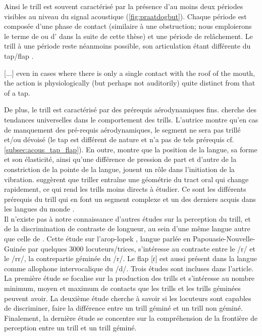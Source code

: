 Ainsi le trill est souvent caractérisé par la présence d'au moins deux périodes visibles au niveau du signal acoustique (\autoref{fig:praatdogbut}). Chaque période est composée d'une phase de contact (similaire à une obstruction; nous emploierons le terme de  ou d' dans la suite de cette thèse) et une période de relâchement. Le trill à une période reste néanmoins possible, son articulation étant différente du tap/flap \parencite{spajicTrillsToda1996}.

\begin{displayquote}
	\textrm{[...]} even in cases where there is only a single contact with the roof of the mouth, the action is physiologically (but perhaps not auditorily) quite distinct from that of a tap. \parencite[p.50]{ladefogedPreliminariesLinguisticPhonetics1971}
\end{displayquote}


De plus, le trill est caractérisé par des prérequis aérodynamiques fins. \textcite{soleAerodynamicCharacteristicsTrills2002} cherche des tendances universelles dans le comportement des trills. L'autrice montre qu'en cas de manquement des pré-requis aérodynamiques, le segment ne sera pas trillé et/ou dévoisé (le tap est différent de nature et n'a pas de tels prérequis cf. \autoref{subsec:acous_tap_flap}).
En outre, \textcite{mcgowanTongueTipTrills1992} montre que la position de la langue, sa forme et son élasticité, ainsi qu'une différence de pression de part et d'autre de la constriction de la pointe de la langue, jouent un rôle dans l'initiation de la vibration.
\textcite{dhananjayaAcousticAnalysisTrill2012} suggèrent que triller entraîne une géométrie du tract oral qui change rapidement, ce qui rend les trills moins directs à étudier.
Ce sont les différents prérequis du trill qui en font un segment complexe et un des derniers acquis dans les langues du monde \parencite{mcleodChildrenConsonantAcquisition2018}.\\

Il n'existe pas à notre connaissance d'autres études sur la perception du trill, et de la discrimination de contraste de longueur, au sein d'une même langue autre que celle de \textcite{raymondInitialMedialGeminate2005}. Cette étude sur l'arop-lopek , langue parlée en Papouasie-Nouvelle-Guinée par quelques 3000 locuteurs/trices, s'intéresse au contraste entre le /r/ et le /rr/, la contrepartie géminée du /r/. Le flap [ɾ] est aussi présent dans la langue comme allophone intervocalique du /d/.
Trois études sont incluses dans l'article.
La première étude se focalise sur la production des trills et s'intéresse au nombre minimum, moyen et maximum de contacts que les trills et les trills géminées peuvent avoir.
La deuxième étude cherche à savoir si les locuteurs sont capables de discriminer, faire la différence entre un trill géminé et un trill non géminé. 
Finalement, la dernière étude se concentre sur la compréhension de la frontière de perception entre un trill et un trill géminé.\\

